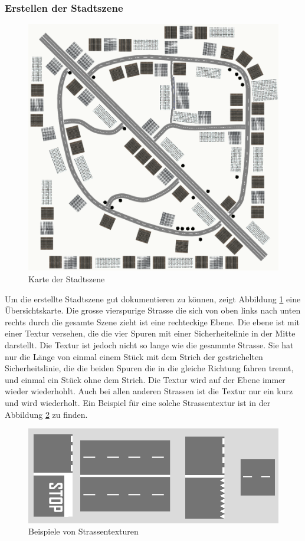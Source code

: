 \subsubsection{Erstellen der Stadtszene}
\begin{figure}[H]
\centering 
\includegraphics[width=1\linewidth]{src/CityWorld_map.png}
\caption{Karte der Stadtszene} %
\label{CityWorld_map} %
\end{figure}
Um die erstellte Stadtszene gut dokumentieren zu können, zeigt Abbildung \ref{CityWorld_map} eine Übersichtskarte. Die grosse vierspurige Strasse die sich von oben links nach unten rechts durch die gesamte Szene zieht ist eine rechteckige Ebene. Die ebene ist mit einer Textur versehen, die die vier Spuren mit einer Sicherheitelinie in der Mitte darstellt. Die Textur ist jedoch nicht so lange wie die gesammte Strasse. Sie hat nur die Länge von einmal einem Stück mit dem Strich der gestrichelten Sicherheitslinie, die die beiden Spuren die in die gleiche Richtung fahren trennt, und einmal ein Stück ohne dem Strich. Die Textur wird auf der Ebene immer wieder wiederhohlt. Auch bei allen anderen Strassen ist die Textur nur ein kurz und wird wiederholt. Ein Beispiel für eine solche Strassentextur ist in der Abbildung \ref{examples_street_textures} zu finden. \\
\begin{figure}[H]
\centering 
\includegraphics[scale=0.6]{src/examples_street_textures.png}
\caption{Beispiele von Strassentexturen} %
\label{examples_street_textures} %
\end{figure}
